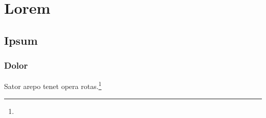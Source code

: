 \documentclass[12pt,oneside]{memoir}
\begin{document}
\chapter{Lorem}

\section{Ipsum}

\lipsum[1-5]

\subsection{Dolor}

\lipsum[6]
Sator arepo tenet opera rotas.\footnote{\lipsum[11]}
\lipsum[7-10]

\lipsum[11-20]
\end{document}
